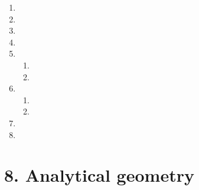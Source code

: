 \begin{enumerate}[itemsep=6pt, label=\textbf{\arabic*}. ]
\item %
 
\item %
\item %


\item %
\item %
\begin{enumerate}[noitemsep, label=\textbf{(\alph*)} ]
\item %
\item %
\end{enumerate} 
\item %
\begin{enumerate}[noitemsep, label=\textbf{(\alph*)} ] 
\item %
\item %
\end{enumerate} 
\item %
\item %

\end{enumerate}


\section {8. Analytical geometry}
